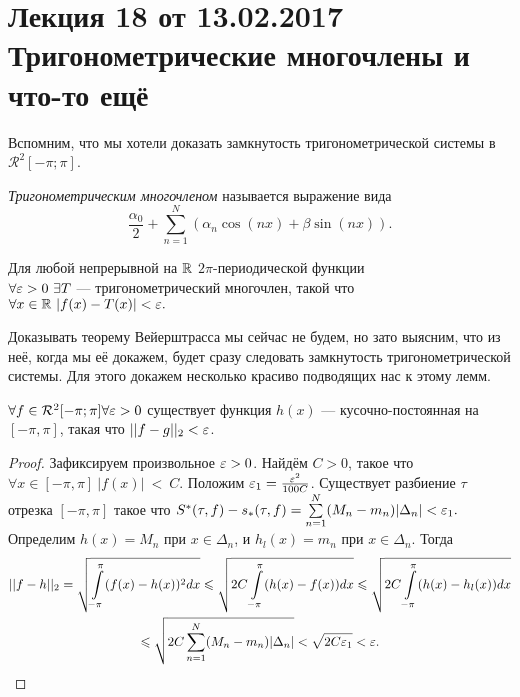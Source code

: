 \section{Лекция 18 от 13.02.2017 \\ Тригонометрические многочлены и что-то ещё}
Вспомним, что мы хотели доказать замкнутость тригонометрической системы в $\mathcal{R}^2[-\pi;\pi]$.
\begin{Def}
\textit{Тригонометрическим многочленом} называется выражение вида
$$
\frac{\alpha_0}{2} + \sum\limits_{n = 1}^N\left(\alpha_n \cos(nx) +\beta \sin(nx)\right).
$$
\end{Def}
\begin{Theorem}[Вейерштрасса]
    Для любой непрерывной на $\mathbb{R}$ $2\pi$-периодической функции \\$\forall \varepsilon>0\  \exists T$ --- тригонометрический многочлен, такой что $\forall x \in \mathbb{R} \ |f(x)-T(x)|<\varepsilon.$
\end{Theorem}
Доказывать теорему Вейерштрасса мы сейчас не будем, но зато выясним, что из неё, когда мы её докажем, будет сразу следовать замкнутость тригонометрической системы. Для этого докажем несколько красиво подводящих нас к этому лемм.

\begin{Lemma}
   $\forall f \in \mathcal{R}^2[-\pi;\pi] \forall \varepsilon > 0$ существует функция $ h(x)$ --- кусочно-постоянная на $[-\pi, \pi]$, такая что $||f-g||_2 < \varepsilon$.
\end{Lemma}
\begin{proof}
    Зафиксируем произвольное $\varepsilon >0$. Найдём $C>0$, такое что $\forall x \in [-\pi, \pi]\ |f(x)|~<~C$. Положим $\varepsilon_1 = \frac{\varepsilon^2}{100C}$. Существует разбиение  $\tau$ отрезка $[-\pi, \pi]$ такое что $S^*(\tau, f)- s_*(\tau, f) = \sum\limits_{n=1}^N (M_n-m_n)|\Delta_n|< \varepsilon_1.$\\
    Определим $h(x) = M_n$ при $x \in \Delta_n$, и $h_l(x) = m_n$ при $x \in \Delta_n$. Тогда 
     \begin{multline} ||f-h||_2 = \sqrt{\int\limits_{-\pi}^{\pi}(f(x)-h(x))^2dx} \leqslant \sqrt{2C\int\limits_{-\pi}^{\pi}(h(x)-f(x))dx} \leqslant \sqrt{2C\int\limits_{-\pi}^{\pi}(h(x)-h_l(x))dx}\\ \leqslant \sqrt{2C\sum\limits_{n=1}^N (M_n-m_n)|\Delta_n|} < \sqrt{2C\varepsilon_1} < \varepsilon. \end{multline}
\end{proof}

